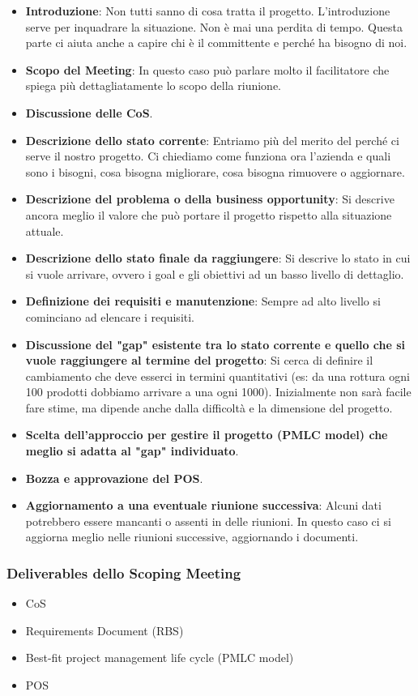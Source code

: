 \begin{itemize}
	\item \textbf{Introduzione}: Non tutti sanno di cosa tratta il progetto. L'introduzione serve per inquadrare la situazione. Non è mai una perdita di tempo. Questa parte ci aiuta anche a capire chi è il committente e perché ha bisogno di noi.
	\item \textbf{Scopo del Meeting}: In questo caso può parlare molto il facilitatore che spiega più dettagliatamente lo scopo della riunione.
	\item \textbf{Discussione delle CoS}.
	\item \textbf{Descrizione dello stato corrente}: Entriamo più del merito del perché ci serve il nostro progetto. Ci chiediamo come funziona ora l'azienda e quali sono i bisogni, cosa bisogna migliorare, cosa bisogna rimuovere o aggiornare.
	\item \textbf{Descrizione del problema o della business opportunity}: Si descrive ancora meglio il valore che può portare il progetto rispetto alla situazione attuale.
	\item \textbf{Descrizione dello stato finale da raggiungere}: Si descrive lo stato in cui si vuole arrivare, ovvero i goal e gli obiettivi ad un basso livello di dettaglio.
	\item \textbf{Definizione dei requisiti e manutenzione}: Sempre ad alto livello si cominciano ad elencare i requisiti.
	\item \textbf{Discussione del "gap" esistente tra lo stato corrente e quello che si vuole raggiungere al termine del progetto}: Si cerca di definire il cambiamento che deve esserci in termini quantitativi (es: da una rottura ogni 100 prodotti dobbiamo arrivare a una ogni 1000). Inizialmente non sarà facile fare stime, ma dipende anche dalla difficoltà e la dimensione del progetto.
	\item \textbf{Scelta dell'approccio per gestire il progetto (PMLC model) che meglio si adatta al "gap" individuato}.
	\item \textbf{Bozza e approvazione del POS}.
	\item \textbf{Aggiornamento a una eventuale riunione successiva}: Alcuni dati potrebbero essere mancanti o assenti in delle riunioni. In questo caso ci si aggiorna meglio nelle riunioni successive, aggiornando i documenti.
\end{itemize}
\subsubsection{Deliverables dello Scoping Meeting}
\begin{itemize}
	\item CoS
	\item Requirements Document (RBS)
	\item Best-fit project management life cycle (PMLC model)
	\item POS
\end{itemize}
